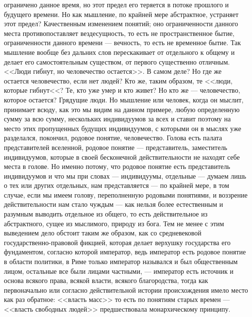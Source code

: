 \documentclass[12pt]{article}
\begin{document}
ограничено данное время, но этот предел его теряется в потоке прошлого и будущего времени. Но как мышление, по крайней мере абстрактное, устраняет этот предел? Качественным изменением понятий; оно ограниченности данного места противопоставляет вездесущность, то есть не пространственное бытие, ограниченности данного времени --- вечность, то есть не временное бытие. Так мышление вообще без дальних слов перескакивает от отдельного к общему и делает его самостоятельным существом, от первого существенно отличным. <<Люди гибнут, но человечество остается>>. В самом деле? Но где же остается человечество, если нет людей? Кто же, таким образом, те <<люди, которые гибнут<<? Те, кто уже умер и кто живет? Но кто же --- человечество, которое остается? Грядущие люди. Но мышление или человек, когда он мыслит, принимает всюду, как это мы видим на данном примере, любую определенную сумму за всю сумму, нескольких индивидуумов за всех и ставит поэтому на место этих пропущенных будущих индивидуумов, с которыми он в мыслях уже разделался, покончил, родовое понятие, человечество. Голова есть палата представителей вселенной, родовое понятие --- представитель, заместитель индивидуумов, которые в своей бесконечной действительности не находят себе места в голове. Но именно потому, что родовое понятие есть представитель индивидуумов и что мы при словах --- индивидуумы, отдельные --- думаем лишь о тех или других отдельных, нам представляется --- по крайней мере, в том случае, если мы имеем голову, переполненную родовыми понятиями, и воззрение действительности нам стало чуждым --- как нельзя более естественным и разумным выводить отдельное из общего, то есть действительное из абстрактного, сущее из мыслимого, природу из бога. Тем не менее с этим выведением дело обстоит таким же образом, как со средневековой государственно-правовой фикцией, которая делает верхушку государства его фундаментом, согласно которой император, ведь император есть родовое понятие в области политики, в Риме только император назывался и был общественным лицом, остальные все были лицами частными, --- император есть источник и основа всякого права, всякой власти, всякого благородства, тогда как первоначально или согласно действительной истории происхождения имело место как раз обратное: <<власть масс>>  то есть по понятиям старых времен --- <<власть свободных людей>>  предшествовала монархическому принципу. 
\end{document}
